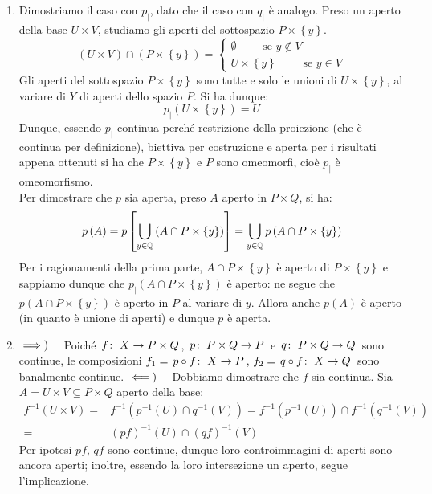 \begin{demonstration}
\begin{enumerate}[label=\Roman*]
\begin{enumerate}[label=\alph*)]
		\end{enumerate}
		\item Dimostriamo il caso con $p_{\mid}$, dato che il caso con $q_{\mid}$ è analogo. Preso un aperto della base $U\times V$, studiamo gli aperti del sottospazio $P\times\left\{ y\right\}$.
		\begin{equation*}
			\left(U\times V\right)\cap \left(P\times\left\{ y\right\}\right)=\begin{cases}
				\emptyset\qquad\text{ se }y\notin V\\
				U\times\left\{y\right\}\qquad\text{ se }y\in V
			\end{cases}
		\end{equation*}
		Gli aperti del sottospazio $P\times\left\{ y\right\}$ sono tutte e solo le unioni di $U\times\left\{ y\right\}$, al variare di $Y$ di aperti dello spazio $P$. Si ha dunque:
		\begin{equation*}
			p_{\mid}\left(U\times \left\{y\right\}\right)=U
		\end{equation*}
		Dunque, essendo $p_{\mid}$ continua perché restrizione della proiezione (che è continua per definizione), biettiva per costruzione e aperta per i risultati appena ottenuti si ha che $P\times\left\{ y\right\}$ e $P$ sono omeomorfi, cioè $p_{\mid}$ è omeomorfismo.\\
		Per dimostrare che $p$ sia aperta, preso $A$ aperto in $P\times Q$, si ha:
		\begin{equation}
			p\left(A\right)=p\left[\mathop{{\bigcup}}\displaylimits_{y\in\mathbb{Q}}\left(A\cap P\times\left\{ y\right\}\right)\right]=\mathop{{\bigcup}}\displaylimits_{y\in\mathbb{Q}}p\left(A\cap P\times\left\{ y\right\}\right)
		\end{equation}
		Per i ragionamenti della prima parte, $A\cap P\times\left\{ y\right\}$ è aperto di $P\times\left\{ y\right\}$ e sappiamo dunque che $p_{\mid}\left(A\cap P\times\left\{ y\right\}\right)$ è aperto: ne segue che $p\left(A\cap P\times\left\{ y\right\}\right)$ è aperto in $P$ al variare di $y$. Allora anche $p\left(A\right)$ è aperto (in quanto è unione di aperti) e dunque $p$ è aperta.
		\item $\implies)\quad$ Poiché $\funz{f}{X}{P\times Q}$, $\funz{p}{P\times Q}{P}$ e $\funz{q}{P\times Q}{Q}$ sono continue, le composizioni $f_1=\funz{p\circ f}{X}{P}$, $f_2=\funz{q\circ f}{X}{Q}$ sono banalmente continue.
		$\impliedby)\quad$ Dobbiamo dimostrare che $f$ sia continua. Sia $A=U\times V\subseteq P\times Q$ aperto della base:
		\begin{align*}
			f^{-1}\left(U\times V\right)=&f^{-1}\left(p^{-1}\left(U\right)\cap q^{-1}\left(V\right)\right)=f^{-1}\left(p^{-1}\left(U\right)\right)\cap f^{-1}\left(q^{-1}\left(V\right)\right) \\
			=& \left(pf\right)^{-1}\left(U\right)\cap \left(qf\right)^{-1}\left(V\right)
		\end{align*}
		Per ipotesi $pf$, $qf$ sono continue, dunque loro controimmagini di aperti sono ancora aperti; inoltre, essendo la loro intersezione un aperto, segue l'implicazione.
	\end{enumerate}
\end{demonstration}
